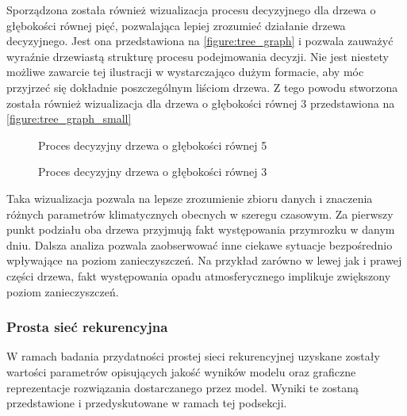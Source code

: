 \documentclass[10pt,a4paper]{article}
\begin{document}
Sporządzona została również wizualizacja procesu decyzyjnego dla drzewa o głębokości równej pięć, pozwalająca lepiej zrozumieć działanie drzewa decyzyjnego. Jest ona przedstawiona na \autoref{figure:tree_graph} i pozwala zauważyć wyraźnie drzewiastą strukturę procesu podejmowania decyzji. Nie jest niestety możliwe zawarcie tej ilustracji w wystarczająco dużym formacie, aby móc przyjrzeć się dokładnie poszczególnym liściom drzewa. Z tego powodu stworzona została również wizualizacja dla drzewa o głębokości równej 3 przedstawiona na \autoref{figure:tree_graph_small}
\begin{figure}[!ht]
	\centering
	\caption{Proces decyzyjny drzewa o głębokości równej 5}
	\label{figure:tree_graph}
\end{figure}
\FloatBarrier
\begin{figure}[!ht]
	\centering
	\caption{Proces decyzyjny drzewa o głębokości równej 3}
	\label{figure:tree_graph_small}
\end{figure}
\FloatBarrier
Taka wizualizacja pozwala na lepsze zrozumienie zbioru danych i znaczenia różnych parametrów klimatycznych obecnych w szeregu czasowym. Za pierwszy punkt podziału oba drzewa przyjmują fakt występowania przymrozku w danym dniu. Dalsza analiza pozwala zaobserwować inne ciekawe sytuacje bezpośrednio wpływające na poziom zanieczyszczeń. Na przykład zarówno w lewej jak i prawej części drzewa, fakt występowania opadu atmosferycznego implikuje zwiększony poziom zanieczyszczeń. 

\subsubsection{Prosta sieć rekurencyjna}
W ramach badania przydatności prostej sieci rekurencyjnej uzyskane zostały wartości parametrów opisujących jakość wyników modelu oraz graficzne reprezentacje rozwiązania dostarczanego przez model. Wyniki te zostaną przedstawione i przedyskutowane w ramach tej podsekcji.
\end{document}
